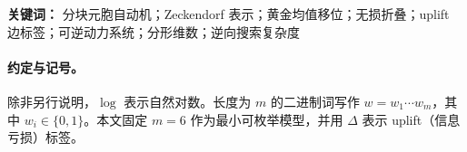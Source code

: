 
\begin{abstract}
本文提出并实现一种仅由一个局部“折叠核”驱动的离散分块元胞自动机（Block Cellular Automaton），称为 \textbf{HPA-CA}。其核心是最小窗口长度 $m=6$ 下的折叠映射 $\Fold_6$：将 $6$ 比特微观索引集 $\Omega_6\simeq\{0,\dots,63\}$（$64$ 态）通过 Zeckendorf 归一化与窗口截断映射到黄金均值文法允许词集合 $X_6\subset\{0,1\}^6$（$21$ 态）。$\Fold_6$ 具有刚性而完全可枚举的多对一纤维结构：每个稳定态的原像数只能取 $2,3,4$，并满足固定直方图 $(8,4,9)$；边界态 $\{100001,100101,101001\}$ 的原像对可显式给出。我们进一步将折叠“丢失的信息”提升为显式的 \textbf{uplift 边标签}（时间边寄存器），从而把不可逆的 $64\to 21$ 压缩升级为时空图意义下\textbf{无损}的动力系统：空间层仅保留稳定态（$21$ 态），时间层以边标签记录 uplift，使得全演化可逆。

我们给出可复现实验原型：随机初态与单激发初态均生成长程纹理；系统自发收敛至稳定密度区间并呈现近幂律功率谱与稳定的盒计数分形维数（约 $1.81\sim 1.82$）。最后，我们提出“观察者时间 = 逆向一致性搜索成本”的纯数学定义：在仅观察 $21$ 态层而不直接读取 uplift 的条件下，重建微观历史等价于受约束的有限分支搜索；其算法复杂度可作为局部时间尺度（lapse）的离散原型，从而在纯数学层面解释“复杂结构时间慢”的现象学。
\end{abstract}

\begin{sloppypar}
\textbf{关键词：} 分块元胞自动机；Zeckendorf 表示；黄金均值移位；无损折叠；uplift 边标签；可逆动力系统；分形维数；逆向搜索复杂度
\end{sloppypar}

\paragraph{约定与记号。}
除非另行说明，$\log$ 表示自然对数。长度为 $m$ 的二进制词写作 $w=w_1\cdots w_m$，其中 $w_i\in\{0,1\}$。本文固定 $m=6$ 作为最小可枚举模型，并用 $\Delta$ 表示 uplift（信息亏损）标签。

